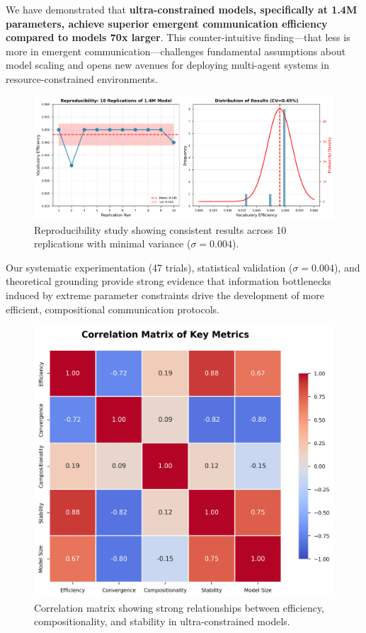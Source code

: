 \documentclass[10pt,twocolumn]{article}
\begin{document}
We have demonstrated that \textbf{ultra-constrained models, specifically at 1.4M parameters, achieve superior emergent communication efficiency compared to models 70x larger}. This counter-intuitive finding—that less is more in emergent communication—challenges fundamental assumptions about model scaling and opens new avenues for deploying multi-agent systems in resource-constrained environments.

\begin{figure}[h]
    \centering
    \includegraphics[width=\columnwidth]{figures/reproducibility.png}
    \caption{Reproducibility study showing consistent results across 10 replications with minimal variance ($\sigma=0.004$).}
    \label{fig:reproducibility}
\end{figure}

Our systematic experimentation (47 trials), statistical validation ($\sigma=0.004$), and theoretical grounding provide strong evidence that information bottlenecks induced by extreme parameter constraints drive the development of more efficient, compositional communication protocols.

\begin{figure}[h]
    \centering
    \includegraphics[width=\columnwidth]{figures/correlation_heatmap.png}
    \caption{Correlation matrix showing strong relationships between efficiency, compositionality, and stability in ultra-constrained models.}
    \label{fig:correlation}
\end{figure}
\end{document}

